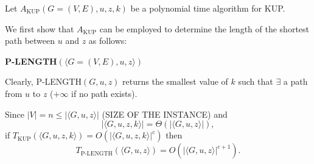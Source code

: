 Let $A_{\mathrm{KUP}}(G=(V,E),u,z,k)$ be a polynomial time algorithm for KUP.

We first show that $A_{\mathrm{KUP}}$ can be employed to determine the length of the shortest path between $u$ and $z$ as follows:

\begin{notesalgorithm}
\textbf{P-LENGTH$(\langle G=(V,E),u,z\rangle)$}
\begin{notespseudocode}
\end{notespseudocode}
\end{notesalgorithm}
Clearly, P-LENGTH$(G,u,z)$ returns the smallest value of $k$ such that $\exists$ a path from $u$ to $z$ ($+\infty$ if no path exists).

Since $|V|=n\leq|\langle G,u,z\rangle|$ (SIZE OF THE INSTANCE) and
\[
|\langle G,u,z,k\rangle|=\Theta(|\langle G,u,z\rangle|),
\]
if $T_{\mathrm{KUP}}(\langle G,u,z,k\rangle)=O(|\langle G,u,z,k\rangle|^c)$ then
\[
T_{\mathrm{P\text{-}LENGTH}}(\langle G,u,z\rangle)=O(|\langle G,u,z\rangle|^{c+1}).
\]
